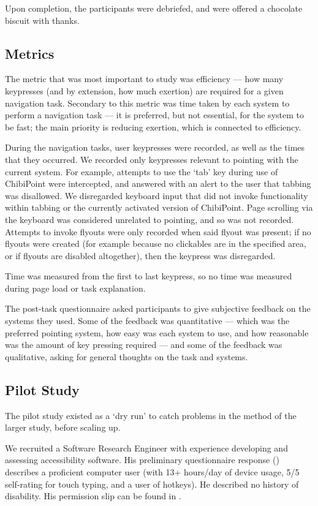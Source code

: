 \documentclass[11pt,openright,a4paper]{report}
\begin{document}
Upon completion, the participants were debriefed, and were offered a chocolate biscuit with thanks.

\subsection{Metrics}
The metric that was most important to study was efficiency --- how many keypresses (and by extension, how much exertion) are required for a given navigation task. Secondary to this metric was time taken by each system to perform a navigation task --- it is preferred, but not essential, for the system to be fast; the main priority is reducing exertion, which is connected to efficiency.

During the navigation tasks, user keypresses were recorded, as well as the times that they occurred. We recorded only keypresses relevant to pointing with the current system. For example, attempts to use the `tab' key during use of ChibiPoint were intercepted, and answered with an alert to the user that tabbing was disallowed. We disregarded keyboard input that did not invoke functionality within tabbing or the currently activated version of ChibiPoint. Page scrolling via the keyboard was considered unrelated to pointing, and so was not recorded. Attempts to invoke flyouts were only recorded when said flyout was present; if no flyouts were created (for example because no clickables are in the specified area, or if flyouts are disabled altogether), then the keypress was disregarded.

Time was measured from the first to last keypress, so no time was measured during page load or task explanation.

The post-task questionnaire asked participants to give subjective feedback on the systems they used. Some of the feedback was quantitative --- which was the preferred pointing system, how easy was each system to use, and how reasonable was the amount of key pressing required --- and some of the feedback was qualitative, asking for general thoughts on the task and systems.

\subsection{Pilot Study}
The pilot study existed as a `dry run' to catch problems in the method of the larger study, before scaling up.

We recruited a Software Research Engineer with experience developing and assessing accessibility software. His preliminary questionnaire response () describes a proficient computer user (with 13+ hours/day of device usage, 5/5 self-rating for touch typing, and a user of hotkeys). He described no history of disability. His permission slip can be found in .
\end{document}
